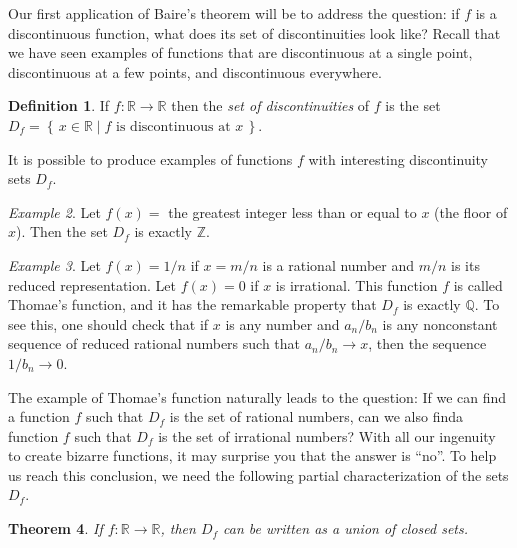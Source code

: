 \documentclass[11pt,oneside]{amsbook}
\newcommand{\set}[1]{\left\{\,#1\,\right\}}
\newcommand{\Q}{\mathbb Q}
\newcommand{\R}{\mathbb R}
\theoremstyle{definition}
\theoremstyle{plain}
\newtheorem{theorem}{Theorem}[section]
\theoremstyle{definition}
\newtheorem{definition}[theorem]{Definition}
\theoremstyle{remark}
\newtheorem{example}[theorem]{Example}
\numberwithin{equation}{section}
\numberwithin{figure}{section}
\begin{document}
Our first application of Baire's theorem will be to address the question: if $f$ is a discontinuous function, what does its set of discontinuities look like? Recall that we have seen examples of functions that are discontinuous at a single point, discontinuous at a few points, and discontinuous everywhere.

\begin{definition}
  If $f\colon\R\to\R$ then the \emph{set of discontinuities} of $f$ is the set $D_f=\set{x\in\R\mid\text{$f$ is discontinuous at $x$}}$.
\end{definition}

It is possible to produce examples of functions $f$ with interesting discontinuity sets $D_f$.

\begin{example}
  Let $f(x)=$ the greatest integer less than or equal to $x$ (the floor of $x$). Then the set $D_f$ is exactly $\mathbb Z$.
\end{example}

\begin{example}
  Let $f(x)=1/n$ if $x=m/n$ is a rational number and $m/n$ is its reduced representation. Let $f(x)=0$ if $x$ is irrational. This function $f$ is called Thomae's function, and it has the remarkable property that $D_f$ is exactly $\Q$. To see this, one should check that if $x$ is any number and $a_n/b_n$ is any nonconstant sequence of reduced rational numbers such that $a_n/b_n\to x$, then the sequence $1/b_n\to0$.
\end{example}


The example of Thomae's function naturally leads to the question: If we can find a function $f$ such that $D_f$ is the set of rational numbers, can we also finda  function $f$ such that $D_f$ is the set of irrational numbers? With all our ingenuity to create bizarre functions, it may surprise you that the answer is ``no''. To help us reach this conclusion, we need the following partial characterization of the sets $D_f$.

\begin{theorem}
  \label{thm:df-closed}
  If $f\colon\R\to\R$, then $D_f$ can be written as a union of closed sets.
\end{theorem}
\end{document}
